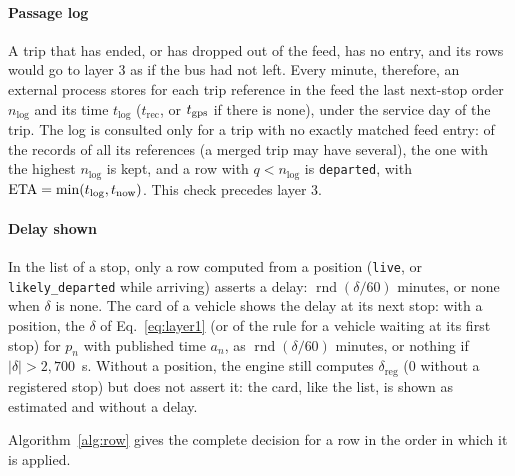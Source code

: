 \paragraph{Passage log} A trip that has ended, or has dropped out of the feed, has no entry, and its rows would go to
layer 3 as if the bus had not left. Every minute, therefore, an external process stores for each trip reference in the
feed the last next-stop order $n_{\mathrm{log}}$ and its time $t_{\mathrm{log}}$ ($t_{\mathrm{rec}}$, or $t_{\mathrm{gps}}$ if
there is none), under the service day of the trip. The log is consulted only for a trip with no exactly matched feed
entry: of the records of all its references (a merged trip may have several), the one with the highest
$n_{\mathrm{log}}$ is kept, and a row with $q<n_{\mathrm{log}}$ is \texttt{departed}, with
$\mathrm{ETA}=\min(t_{\mathrm{log}},t_{\mathrm{now}})$. This check precedes layer 3.

\paragraph{Delay shown} In the list of a stop, only a row computed from a position (\texttt{live}, or
\texttt{likely\_departed} while arriving) asserts a delay: $\operatorname{rnd}(\delta/60)$ minutes, or none when
$\delta$ is none. The card of a vehicle shows the delay at its next stop: with a position, the $\delta$ of
Eq.~\eqref{eq:layer1} (or of the rule for a vehicle waiting at its first stop) for $p_n$ with published time $a_n$, as
$\operatorname{rnd}(\delta/60)$ minutes, or nothing if $|\delta|>2{,}700$~s. Without a position, the engine still
computes $\delta_{\mathrm{reg}}$ (0 without a registered stop) but does not assert it: the card, like the list, is
shown as estimated and without a delay.

Algorithm~\ref{alg:row} gives the complete decision for a row in the order in which it is applied.


